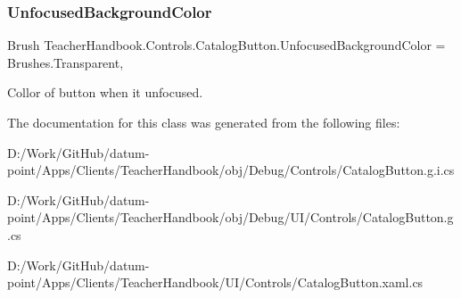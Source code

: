 \subsubsection{\texorpdfstring{Unfocused\+Background\+Color}{UnfocusedBackgroundColor}}
{\footnotesize\ttfamily Brush Teacher\+Handbook.\+Controls.\+Catalog\+Button.\+Unfocused\+Background\+Color = Brushes.\+Transparent\hspace{0.3cm}{\ttfamily [get]}, {\ttfamily [set]}}



Collor of button when it unfocused. 



The documentation for this class was generated from the following files\+:\begin{DoxyCompactItemize}
\item 
D\+:/\+Work/\+Git\+Hub/datum-\/point/\+Apps/\+Clients/\+Teacher\+Handbook/obj/\+Debug/\+Controls/Catalog\+Button.\+g.\+i.\+cs\item 
D\+:/\+Work/\+Git\+Hub/datum-\/point/\+Apps/\+Clients/\+Teacher\+Handbook/obj/\+Debug/\+U\+I/\+Controls/Catalog\+Button.\+g.\+cs\item 
D\+:/\+Work/\+Git\+Hub/datum-\/point/\+Apps/\+Clients/\+Teacher\+Handbook/\+U\+I/\+Controls/Catalog\+Button.\+xaml.\+cs\end{DoxyCompactItemize}
